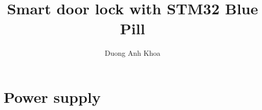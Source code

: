 \documentclass[12pt]{report}
\begin{document}
	\title{Smart door lock with STM32 Blue Pill}
	\author{Duong Anh Khoa}
	\maketitle %
	
	\tableofcontents
	
	\setcounter{chapter}{1} %
	\chapter{Power supply}
	\newpage
	
\end{document}
